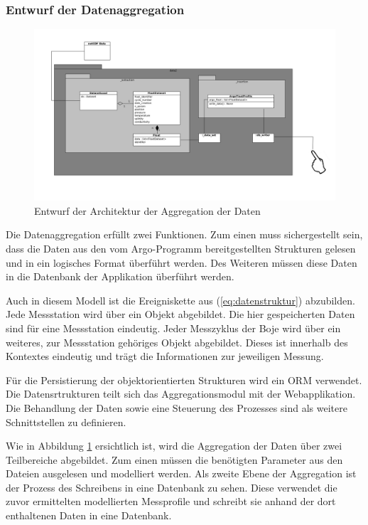 \subsubsection{Entwurf der Datenaggregation}\label{sec:entwurfAggregation}
\begin{figure}[h!]
\centering
\includegraphics[width=\textwidth]{pix/grobentwurf_dataaggregation.png}
\caption{Entwurf der Architektur der Aggregation der Daten}
\label{fig:grobetwurf_architektur_datenaggregation}
\end{figure}

Die Datenaggregation erfüllt zwei Funktionen. Zum einen muss sichergestellt sein, dass die Daten aus den vom Argo-Programm bereitgestellten Strukturen gelesen und in ein logisches Format überführt werden. Des Weiteren müssen diese Daten in die Datenbank der Applikation überführt werden.

Auch in diesem Modell ist die Ereigniskette aus (\ref{eq:datenstruktur}) abzubilden. Jede Messstation wird über ein Objekt abgebildet. Die hier gespeicherten Daten sind für eine Messstation eindeutig. Jeder Messzyklus der Boje wird über ein weiteres, zur Messstation gehöriges Objekt abgebildet. Dieses ist innerhalb des Kontextes eindeutig und trägt die Informationen zur jeweiligen Messung.

Für die Persistierung  der objektorientierten Strukturen wird ein \gls{ORM} verwendet. Die Datensrtrukturen teilt sich das Aggregationsmodul mit der Webapplikation. Die Behandlung der Daten sowie eine Steuerung des Prozesses sind als weitere Schnittstellen zu definieren.

Wie in Abbildung \ref{fig:grobetwurf_architektur_datenaggregation} ersichtlich ist, wird die Aggregation der Daten über zwei Teilbereiche abgebildet. Zum einen müssen die benötigten Parameter aus den Dateien ausgelesen und modelliert werden.
Als zweite Ebene der Aggregation ist der Prozess des Schreibens in eine Datenbank zu sehen. Diese verwendet die zuvor ermittelten modellierten Messprofile und schreibt sie anhand der dort enthaltenen Daten in eine Datenbank.


